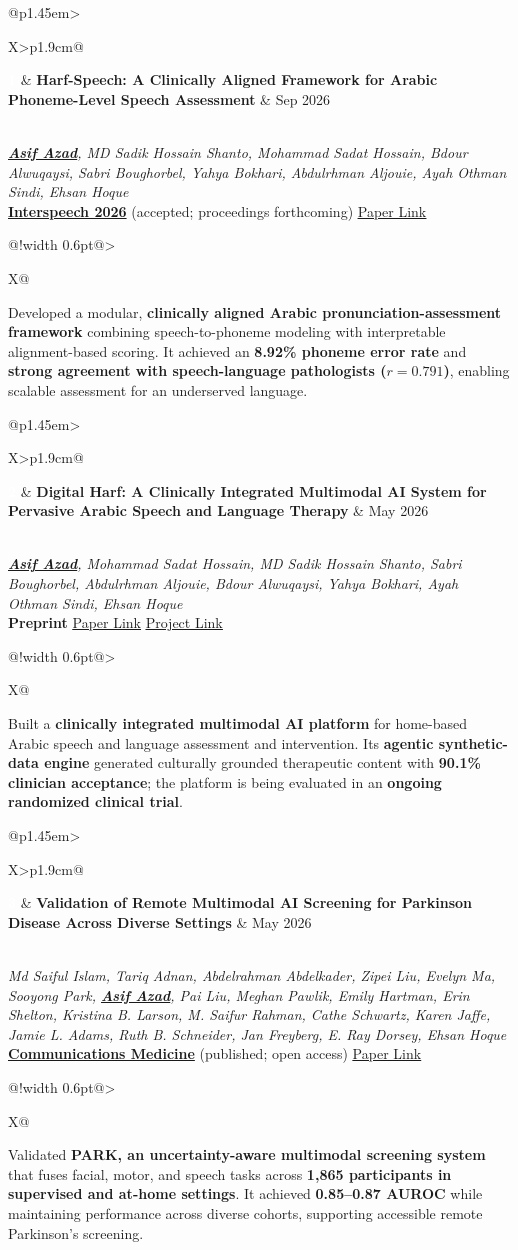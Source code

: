 \documentclass[10pt,letterpaper]{article}
\makeatletter
\newenvironment{entry}
    {\begin{minipage}{\linewidth}\color{textColor}}
    {\end{minipage}}
\newcommand{\selectedpublication}[6]{%
    \begin{entry}
        \begin{tabularx}{\linewidth}{@{}p{1.45em}>{\raggedright\arraybackslash}X>{\raggedleft\arraybackslash}p{1.9cm}@{}}
            {\setlength{\fboxsep}{1.4pt}\colorbox{primaryColor}{\textcolor{white}{\bfseries\scriptsize #1}}}
            & \textbf{#2}
            & \textcolor{mutedColor}{#3}
        \end{tabularx}\\[0.20em]
        #4\\[0.18em]
        #5\\[0.30em]
        \begin{tabularx}{\linewidth}{@{\hspace{1.45em}}!{\color{mutedColor}\vrule width 0.6pt}@{\hspace{0.62em}}>{\raggedright\arraybackslash}X@{}}
            \textcolor{textColor}{#6}
        \end{tabularx}
    \end{entry}
    \vspace{0.78em}
}
\makeatother
\begin{document}
\selectedpublication
    {1}
    {Harf-Speech: A Clinically Aligned Framework for Arabic Phoneme-Level Speech Assessment}
    {Sep 2026}
    {\textit{\textbf{\underline{Asif Azad}}, MD Sadik Hossain Shanto, Mohammad Sadat Hossain, Bdour Alwuqaysi, Sabri Boughorbel, Yahya Bokhari, Abdulrhman Aljouie, Ayah Othman Sindi, Ehsan Hoque}}
    {\href{https://www.isca-speech.org/event-5462701}{\textbf{Interspeech 2026}} (accepted; proceedings forthcoming) \enspace\textbar\enspace \href{https://arxiv.org/abs/2604.06191}{\underline{Paper Link}}}
    {Developed a modular, \textbf{clinically aligned Arabic pronunciation-assessment framework} combining speech-to-phoneme modeling with interpretable alignment-based scoring. It achieved an \textbf{8.92\% phoneme error rate} and \textbf{strong agreement with speech-language pathologists (\(r=0.791\))}, enabling scalable assessment for an underserved language.}

\selectedpublication
    {2}
    {Digital Harf: A Clinically Integrated Multimodal AI System for Pervasive Arabic Speech and Language Therapy}
    {May 2026}
    {\textit{\textbf{\underline{Asif Azad}}, Mohammad Sadat Hossain, MD Sadik Hossain Shanto, Sabri Boughorbel, Abdulrhman Aljouie, Bdour Alwuqaysi, Yahya Bokhari, Ayah Othman Sindi, Ehsan Hoque}}
    {\textbf{Preprint} \enspace\textbar\enspace \href{https://arxiv.org/abs/2607.27212}{\underline{Paper Link}} \enspace\textbar\enspace \href{https://digitalharf.modhs.med.sa/}{\underline{Project Link}}}
    {Built a \textbf{clinically integrated multimodal AI platform} for home-based Arabic speech and language assessment and intervention. Its \textbf{agentic synthetic-data engine} generated culturally grounded therapeutic content with \textbf{90.1\% clinician acceptance}; the platform is being evaluated in an \textbf{ongoing randomized clinical trial}.}

\selectedpublication
    {3}
    {Validation of Remote Multimodal AI Screening for Parkinson Disease Across Diverse Settings}
    {May 2026}
    {\textit{Md Saiful Islam, Tariq Adnan, Abdelrahman Abdelkader, Zipei Liu, Evelyn Ma, Sooyong Park, \textbf{\underline{Asif Azad}}, Pai Liu, Meghan Pawlik, Emily Hartman, Erin Shelton, Kristina B. Larson, M. Saifur Rahman, Cathe Schwartz, Karen Jaffe, Jamie L. Adams, Ruth B. Schneider, Jan Freyberg, E. Ray Dorsey, Ehsan Hoque}}
    {\href{https://www.nature.com/articles/s43856-026-01606-6}{\textbf{Communications Medicine}} (published; open access) \enspace\textbar\enspace \href{https://www.nature.com/articles/s43856-026-01606-6}{\underline{Paper Link}}}
    {Validated \textbf{PARK, an uncertainty-aware multimodal screening system} that fuses facial, motor, and speech tasks across \textbf{1,865 participants in supervised and at-home settings}. It achieved \textbf{0.85--0.87 AUROC} while maintaining performance across diverse cohorts, supporting accessible remote Parkinson's screening.}
\end{document}
